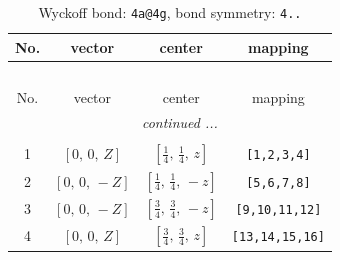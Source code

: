 \documentclass[fleqn,8pt]{jsarticle}
\begin{document}
\begin{longtable}{cccc}
\caption{Wyckoff bond: {\tt 4a@4g}, bond symmetry: {\tt 4..}}
 \\
 \hline \hline
No. & vector & center & mapping \\ \hline \endfirsthead

\multicolumn{3}{l}{\tablename\ \thetable{}} \\
 \hline \hline
No. & vector & center & mapping \\ \hline \endhead

 \hline \hline
\multicolumn{3}{r}{\footnotesize\it continued ...} \\ \endfoot

 \hline \hline
\multicolumn{3}{r}{} \\ \endlastfoot

1 & $\left[ 0,\, 0,\, Z \right]$ & $\left[ \frac{1}{4},\, \frac{1}{4},\, z \right]$ & {\tt [1,2,3,4]} \\ \hline
2 & $\left[ 0,\, 0,\, - Z \right]$ & $\left[ \frac{1}{4},\, \frac{1}{4},\, - z \right]$ & {\tt [5,6,7,8]} \\ \hline
3 & $\left[ 0,\, 0,\, - Z \right]$ & $\left[ \frac{3}{4},\, \frac{3}{4},\, - z \right]$ & {\tt [9,10,11,12]} \\ \hline
4 & $\left[ 0,\, 0,\, Z \right]$ & $\left[ \frac{3}{4},\, \frac{3}{4},\, z \right]$ & {\tt [13,14,15,16]} \\
\end{longtable}
\renewcommand{\arraystretch}{1.2}
\end{document}
